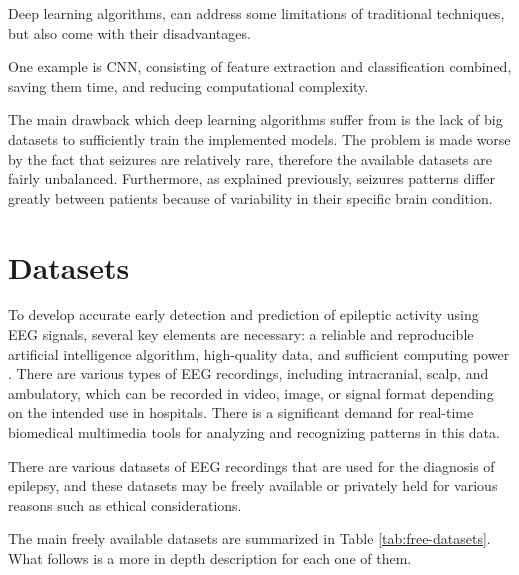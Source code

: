 Deep learning algorithms, can address some limitations of traditional techniques, but also come with their disadvantages. 

One example is \gls{CNN}, consisting of feature extraction and classification combined, saving them time, and reducing computational complexity.

The main drawback which deep learning algorithms suffer from is the lack of big datasets to sufficiently train the implemented models. The problem is made worse by the fact that seizures are relatively rare, therefore the available datasets are fairly unbalanced. Furthermore, as explained previously, seizures patterns differ greatly between patients because of variability in their specific brain condition.

\section{Datasets}
To develop accurate early detection and prediction of epileptic activity using \gls{EEG} signals, several key elements are necessary: a reliable and reproducible artificial intelligence algorithm, high-quality data, and sufficient computing power \cite{handa_open_2021}. There are various types of \gls{EEG} recordings, including intracranial, scalp, and ambulatory, which can be recorded in video, image, or signal format depending on the intended use in hospitals. There is a significant demand for real-time biomedical multimedia tools for analyzing and recognizing patterns in this data.

There are various datasets of \gls{EEG} recordings that are used for the diagnosis of epilepsy, and these datasets may be freely available or privately held for various reasons such as ethical considerations.

The main freely available datasets are summarized in Table \ref{tab:free-datasets}. What follows is a more in depth description for each one of them.

